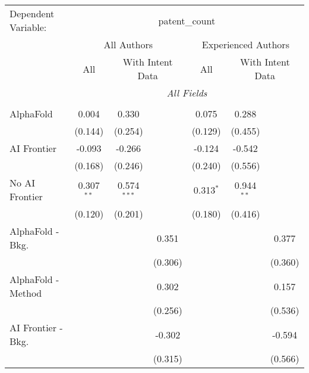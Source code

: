 \begingroup
\centering
\begin{tabular}{lcccccc}
   \tabularnewline \midrule \midrule
   Dependent Variable: & \multicolumn{6}{c}{patent\_count}\\
 & \multicolumn{3}{c}{All Authors} & \multicolumn{3}{c}{Experienced Authors} \\
\cmidrule(lr){2-4} \cmidrule(lr){5-7}
 & \multicolumn{1}{c}{All} & \multicolumn{2}{c}{With Intent Data} & \multicolumn{1}{c}{All} & \multicolumn{2}{c}{With Intent Data} \\
\cmidrule(lr){2-2} \cmidrule(lr){3-4} \cmidrule(lr){5-5} \cmidrule(lr){6-7}
 & \multicolumn{6}{c}{\textit{All Fields}} \\ \\
   AlphaFold               & 0.004        & 0.330         &               & 0.075       & 0.288        &   \\   
                           & (0.144)      & (0.254)       &               & (0.129)     & (0.455)      &   \\   
   AI Frontier             & -0.093       & -0.266        &               & -0.124      & -0.542       &   \\   
                           & (0.168)      & (0.246)       &               & (0.240)     & (0.556)      &   \\   
   No AI Frontier          & 0.307$^{**}$ & 0.574$^{***}$ &               & 0.313$^{*}$ & 0.944$^{**}$ &   \\   
                           & (0.120)      & (0.201)       &               & (0.180)     & (0.416)      &   \\   
   AlphaFold - Bkg.        &              &               & 0.351         &             &              & 0.377\\   
                           &              &               & (0.306)       &             &              & (0.360)\\   
   AlphaFold - Method      &              &               & 0.302         &             &              & 0.157\\   
                           &              &               & (0.256)       &             &              & (0.536)\\   
   AI Frontier - Bkg.      &              &               & -0.302        &             &              & -0.594\\   
                           &              &               & (0.315)       &             &              & (0.566)\\   

\end{tabular}
